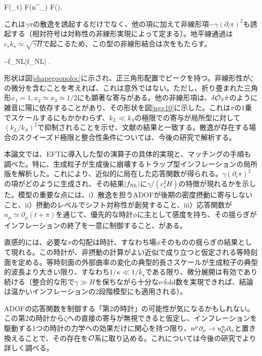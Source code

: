 \beq F(\partial_t\phi) \to  F(n^\mu \partial_\mu \phi) \to F(\dot\phi {}),\eeq

これは$\gamma\dot\pi$の散逸を誘起するだけでなく、他の項に加えて非線形項$-\gamma(\partial_i\pi)^2$も誘起する（相対符号は対称性の非線形実現によって定まる）。地平線通過は$c_sk_\star\simeq\sqrt{\gamma H}$で起こるため、この型の非線形結合は次をもたらす。

\beq  \label{fnlconc}  \sim f_{\rm NL}\zeta \to |f_{\rm NL}| \simeq {} .\eeq

形状は図\ref{shapegoonoloc}に示され、正三角形配置でピークを持つ。非線形性が$\zeta$の微分を含むことを考えれば、これは意外ではない。ただし、折り畳まれた三角形$x_1=1,x_2\simeq x_3\simeq1/2$にも顕著な寄与がある。他の非線形項は、$\delta\dot{{\cal O}}_S\dot\pi$のように雑音に陽に依存することがあり、その形状を図\ref{ngg10}に示した。これは$\dot\pi$の1乗でスケールするにもかかわらず、$k_L\ll k_S$の極限での寄与が局所型に対して$(k_L/k_S)^2$で抑制されることを示せ、文献\cite{creminelli11}の結果と一致する。散逸が存在する場合のスクイーズド極限と整合性条件については、今後の研究で解析する。

本論文では、EFTに導入した型の演算子の具体的実現と、マッチングの手順も調べた。特に、生成粒子が生成後に崩壊するトラップ型インフレーションの局所版を解析した。これにより、近似的に局在した応答関数が得られる。$\gamma(\partial_i\pi)^2$の項がどのように生成され、その結果$|f_{\rm NL}|$に$\gamma/(c_s^2H)$の特徴が現れるかを示した。模型の重要な点には、i）散逸を担うADOFが後期の密度摂動に寄与しないこと、ii）摂動のレベルでシフト対称性が創発すること、iii）応答関数が$n_\mu\simeq\partial_\mu(t+\pi)$を通じて、優先的な時計$\phi$に主として感度を持ち、その揺らぎがインフレーションの終了を一意に制御すること、がある。

直感的には、必要な$\pi$の勾配は時計、すなわち場$\phi$そのものの揺らぎの結果として現れる。この時計が、非摂動の計算がよい近似で成り立つと仮定される等時刻面を定める。等時刻面の外部曲率の変化の典型的長さスケールが生成粒子の典型的波長より大きい限り、すなわち$1/\kappa\ll1/k_\star$である限り、微分展開は有効であり続ける（整合的な形で$\gamma\gg H$を保ちながら十分なe-fold数を実現できれば、結論は温かいインフレーションの2段階模型にも適用される）。

ADOFの応答関数を制御する「第2の時計」の可能性が気になるかもしれない。この第2の時計から$\zeta$への直接の寄与が無視できると仮定し、インフレーションを駆動する1つの時計の力学への効果だけに関心を持つ限り、$n^\mu\partial_\mu\to u_{\cal O}^\alpha\partial_\alpha$と置き換えることで、その存在を${\cal O}$系に取り込める。これについては今後の研究でより詳しく調べる。

